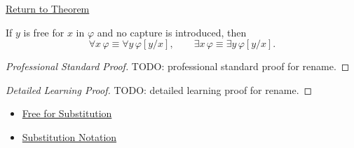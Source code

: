 \newpage
{}
\label{prf:rename}

\begin{remark*}[Return]
\hyperref[thm:rename]{Return to Theorem}
\end{remark*}

\begin{theorem*}
If \(y\) is free for \(x\) in \(\varphi\) and no capture is introduced, then
\[
\forall x\,\varphi\equiv\forall y\,\varphi[y/x],
\qquad
\exists x\,\varphi\equiv\exists y\,\varphi[y/x].
\]
\end{theorem*}

\begin{proof}[Professional Standard Proof]
\LRAProofBodyStart
TODO: professional standard proof for rename.
\end{proof}

\begin{proof}[Detailed Learning Proof]
\LRAProofBodyStart
TODO: detailed learning proof for rename.
\end{proof}

\begin{remark*}
\end{remark*}

\begin{dependencies}
\begin{itemize}
  \item \hyperref[def:free-for]{Free for Substitution}
  \item \hyperref[def:subst-notation]{Substitution Notation}
\end{itemize}
\end{dependencies}

\clearpage
